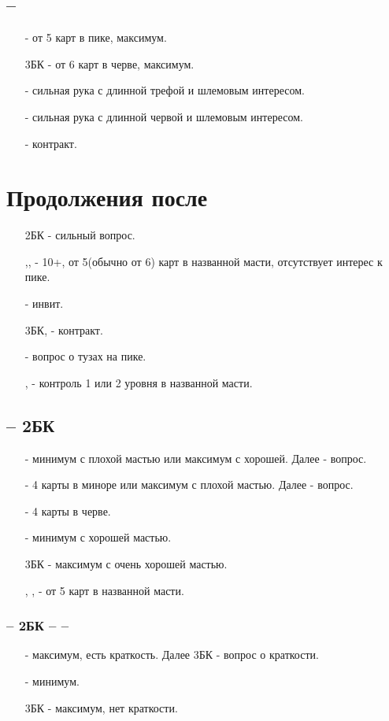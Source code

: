 \documentclass{article}
\begin{document}
\subsection{ -- }
\begin{enumerate}
    \item[\sp{3}] - от 5 карт в пике, максимум.
    \item[3БК] - от 6 карт в черве, максимум.
    \item[\cl{4}] - сильная рука с длинной трефой и шлемовым интересом.
    \item[\di{4}] - сильная рука с длинной червой и шлемовым интересом.
    \item[\he{4}] - контракт.
\end{enumerate}
\section{Продолжения после }
\begin{enumerate}
    \item[2БК] - сильный вопрос.
    \item[\cl{3},\di{3}, \he{3}] - 10+, от 5(обычно от 6) карт в названной масти, отсутствует интерес к пике. 
    \item[\sp{3}] - инвит.
    \item[3БК, \sp{4}] - контракт.
    \item[\cl{4}] - вопрос о тузах на пике.
    \item[\di{4}, \he{4}] - контроль 1 или 2 уровня в названной масти.
\end{enumerate}
\subsection{ -- 2БК}
\begin{enumerate}
    \item[\cl{3}] - минимум с плохой мастью или максимум с хорошей. Далее  - вопрос.
    \item[\di{3}] - 4 карты в миноре или максимум с плохой мастью. Далее  - вопрос.
    \item[\he{3}] - 4 карты в черве.
    \item[\sp{3}] - минимум с хорошей мастью.
    \item[3БК] - максимум с очень хорошей мастью.
    \item[\cl{4}, \di{4}, \he{4}] - от 5 карт в названной масти.
\end{enumerate}
\subsubsection{ -- 2БК --  -- }
\begin{enumerate}
    \item[\he{3}] - максимум, есть краткость. Далее 3БК - вопрос о краткости.
    \item[\sp{3}] - минимум.
    \item[3БК] - максимум, нет краткости.
\end{enumerate}
\end{document}
